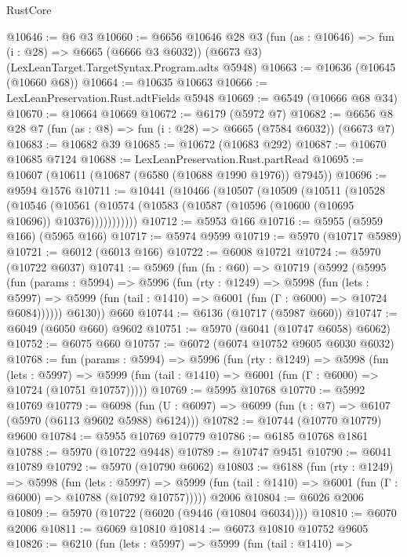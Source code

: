 \begin{lexlean}{RustCore}
\begin{coremodule}
{\begin{coremodule}
{{{{{{{{{{{{{{{{{{{{{{{{{{{{{{{{{{{{{{{{{{{{{@10646 := @6 @3
@10660 := @6656
    @10646
    @28
    @3
    (fun (as : @10646) => fun (i : @28) => @6665 (@6666 @3 @6032))
    (@6673 @3)
    (LexLeanTarget.TargetSyntax.Program.adts @5948)
@10663 := @10636 (@10645 (@10660 @68))
@10664 := @10635 @10663
@10666 := LexLeanPreservation.Rust.adtFields @5948
@10669 := @6549 (@10666 @68 @34)
@10670 := @10664 @10669
@10672 := @6179 (@5972 @7)
@10682 := @6656 @8 @28 @7 (fun (as : @8) => fun (i : @28) => @6665 (@7584 @6032)) (@6673 @7)
@10683 := @10682 @39
@10685 := @10672 (@10683 @292)
@10687 := @10670 @10685 @7124
@10688 := LexLeanPreservation.Rust.partRead
@10695 := @10607 (@10611 (@10687 (@6580 (@10688 @1990 @1976)) @7945))
@10696 := @9594 @1576
@10711 := @10441
    (@10466
      (@10507
        (@10509
          (@10511
            (@10528
              (@10546
                (@10561 (@10574 (@10583 (@10587 (@10596 (@10600 (@10695 @10696)) @10376)))))))))))
@10712 := @5953 @166
@10716 := @5955 (@5959 @166) (@5965 @166)
@10717 := @5974 @9599
@10719 := @5970 (@10717 @5989)
@10721 := @6012 (@6013 @166)
@10722 := @6008 @10721
@10724 := @5970 (@10722 @6037)
@10741 := @5969
    (fun (fn : @60) =>
    @10719
      (@5992
        (@5995
          (fun (params : @5994) =>
          @5996
            (fun (rty : @1249) =>
            @5998
              (fun (lets : @5997) =>
              @5999 (fun (tail : @1410) => @6001 (fun (Γ : @6000) => @10724 @6084))))))
        @6130))
    @660
@10744 := @6136 (@10717 (@5987 @660))
@10747 := @6049 (@6050 @660) @9602
@10751 := @5970 (@6041 (@10747 @6058) @6062)
@10752 := @6075 @660
@10757 := @6072 (@6074 @10752 @9605 @6030 @6032)
@10768 := fun (params : @5994) =>
  @5996
    (fun (rty : @1249) =>
    @5998
      (fun (lets : @5997) =>
      @5999 (fun (tail : @1410) => @6001 (fun (Γ : @6000) => @10724 (@10751 @10757)))))
@10769 := @5995 @10768
@10770 := @5992 @10769
@10779 := @6098 (fun (U : @6097) => @6099 (fun (t : @7) => @6107 (@5970 (@6113 @9602 @5988) @6124)))
@10782 := @10744 (@10770 @10779) @9600
@10784 := @5955 @10769 @10779
@10786 := @6185 @10768 @1861
@10788 := @5970 (@10722 @9448)
@10789 := @10747 @9451
@10790 := @6041 @10789
@10792 := @5970 (@10790 @6062)
@10803 := @6188
    (fun (rty : @1249) =>
    @5998
      (fun (lets : @5997) =>
      @5999 (fun (tail : @1410) => @6001 (fun (Γ : @6000) => @10788 (@10792 @10757)))))
    @2006
@10804 := @6026 @2006
@10809 := @5970 (@10722 (@6020 (@9446 (@10804 @6034))))
@10810 := @6070 @2006
@10811 := @6069 @10810
@10814 := @6073 @10810 @10752 @9605
@10826 := @6210
    (fun (lets : @5997) =>
    @5999
      (fun (tail : @1410) =>
}}}}}}}}}}}}}}}}}}}}}}}}}}}}}}}}}}}}}}}}}}}}}
\end{coremodule}}
\end{coremodule}
\end{lexlean}
